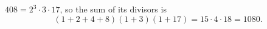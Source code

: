 $408=2^3\cdot3\cdot17$, so the sum of its divisors is
\[(1+2+4+8)(1+3)(1+17)=15\cdot4\cdot18=\boxed{1080}.\]
